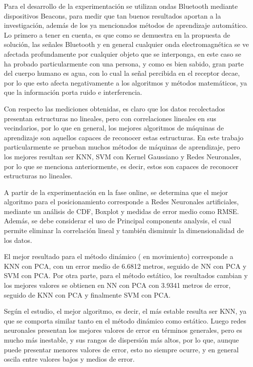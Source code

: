 Para el desarrollo de la experimentación se utilizan ondas Bluetooth mediante dispositivos Beacons, para medir que tan buenos resultados aportan a la investigación, además de los ya mencionados métodos de aprendizaje automático. Lo primero a tener en cuenta, es que como se demuestra en la propuesta de solución, las señales Bluetooth y en general cualquier onda electromagnética se ve afectada profundamente por cualquier objeto que se interponga, en este caso se ha probado particularmente con una persona, y como es bien sabido, gran parte del cuerpo humano es agua, con lo cual la señal percibida en el receptor decae, por lo que esto afecta negativamente a los algoritmos y métodos matemáticos, ya que la información porta ruido e interferencia.

Con respecto las mediciones obtenidas, es claro que los datos recolectados presentan estructuras no lineales, pero con correlaciones lineales en sus vecindarios, por lo que en general, los mejores algoritmos de máquinas de aprendizaje son aquellos capaces de reconocer estas estructuras. En este trabajo particularmente se prueban muchos métodos de máquinas de aprendizaje, pero los mejores resultan ser KNN, SVM con Kernel Gaussiano y Redes Neuronales, por lo que se menciona anteriormente, es decir, estos son capaces de reconocer estructuras no lineales. 

A partir de la experimentación en la fase online, se determina que el mejor algoritmo para el posicionamiento corresponde a Redes Neuronales artificiales, mediante un análisis de CDF, Boxplot y medidas de error medio como RMSE. Además, se debe considerar el uso de Principal components analysis, el cual permite eliminar la correlación lineal y también disminuir la dimensionalidad de los datos.

El mejor resultado para el método dinámico ( en movimiento) corresponde a KNN con PCA, con un error medio de 6.6812 metros, seguido de NN con PCA y SVM  con PCA. Por otra parte, para el método estático, los resultados cambian y los mejores valores se obtienen en NN con PCA con 3.9341 metros de error, seguido de KNN con PCA y finalmente SVM con PCA.

Según el estudio, el mejor algoritmo, es decir, el más estable resulta ser KNN, ya que se comporta similar tanto en el método dinámico como estático. Luego redes neuronales presentan los mejores valores de error en términos generales, pero es mucho más inestable, y sus rangos de dispersión más altos, por lo que, aunque puede presentar menores valores de error, esto no siempre ocurre, y en general oscila entre valores bajos y medios de error.

